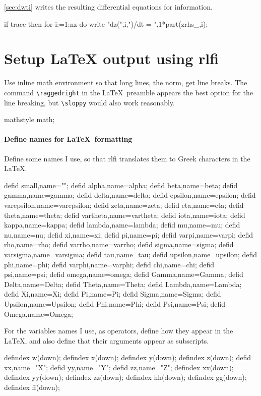 \documentclass[11pt,a5paper]{article}
\def\eps{\varepsilon}
\begin{document}
\cref{sec:dwti} writes the resulting differential equations
for information.
\begin{reduce}
if trace then for i:=1:nz do 
    write "dz(",i,")/dt = ",1*part(zrhs_,i);
\end{reduce}








\section{Setup LaTeX output using rlfi}

Use inline math environment so that long lines, the norm,
get line breaks. The command \verb|\raggedright| in the
\LaTeX\ preamble appears the best option for the line
breaking, but \verb|\sloppy| would also work reasonably.
\begin{reduce}
mathstyle math;
\end{reduce}

\paragraph{Define names for \LaTeX\ formatting}

Define some names I use, so that rlfi translates them to
Greek characters in the \LaTeX.
\begin{reduce}
defid small,name="\eps";%
defid alpha,name=alpha;
defid beta,name=beta;
defid gamma,name=gamma;
defid delta,name=delta;
defid epsilon,name=epsilon;
defid varepsilon,name=varepsilon;
defid zeta,name=zeta;
defid eta,name=eta;
defid theta,name=theta;
defid vartheta,name=vartheta;
defid iota,name=iota;
defid kappa,name=kappa;
defid lambda,name=lambda;
defid mu,name=mu;
defid nu,name=nu;
defid xi,name=xi;
defid pi,name=pi;
defid varpi,name=varpi;
defid rho,name=rho;
defid varrho,name=varrho;
defid sigma,name=sigma;
defid varsigma,name=varsigma;
defid tau,name=tau;
defid upsilon,name=upsilon;
defid phi,name=phi;
defid varphi,name=varphi;
defid chi,name=chi;
defid psi,name=psi;
defid omega,name=omega;
defid Gamma,name=Gamma;
defid Delta,name=Delta;
defid Theta,name=Theta;
defid Lambda,name=Lambda;
defid Xi,name=Xi;
defid Pi,name=Pi;
defid Sigma,name=Sigma;
defid Upsilon,name=Upsilon;
defid Phi,name=Phi;
defid Psi,name=Psi;
defid Omega,name=Omega;
\end{reduce}

For the variables names I use, as operators, define how they
appear in the \LaTeX, and also define that their arguments
appear as subscripts.
\begin{reduce}
defindex w(down);
defindex x(down);
defindex y(down);
defindex z(down);
defid xx,name="X";
defid yy,name="Y";
defid zz,name="Z";
defindex xx(down);
defindex yy(down);
defindex zz(down);
defindex hh(down);
defindex gg(down);
defindex ff(down);
\end{reduce}
\end{document}
